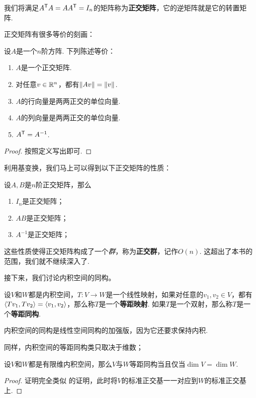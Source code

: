 我们将满足$A^{\mathsf{T}} A=AA^{\mathsf{T}}=I_n$的矩阵称为\textbf{正交矩阵}，它的逆矩阵就是它的转置矩阵. 

正交矩阵有很多等价的刻画：

\begin{proposition}\label{prop:orthogonal-matrix}
设$A$是一个$n$阶方阵. 下列陈述等价：
\begin{enumerate}
    \item $A$是一个正交矩阵.
    \item 对任意$v\in\mathbb{R}^n$，都有$\left\|Av\right\|=\left\|v\right\|$. 
    \item $A$的行向量是两两正交的单位向量.
    \item $A$的列向量是两两正交的单位向量.
    \item $A^{\mathsf{T}}=A^{-1}$.
\end{enumerate}
\end{proposition}
\begin{proof}
    按照定义写出即可. 
\end{proof}

利用基变换，我们马上可以得到以下正交矩阵的性质：

\begin{proposition}\label{prop:orthogonal-matrix-property}
设$A,B$是$n$阶正交矩阵，那么
\begin{enumerate}
    \item $I_n$是正交矩阵；
    \item $AB$是正交矩阵；
    \item $A^{-1}$是正交矩阵；
\end{enumerate}
\end{proposition}

这些性质使得正交矩阵构成了一个\emph{群}，称为\textbf{正交群}，记作$O(n)$. 这超出了本书的范围，我们就不继续深入了.


接下来，我们讨论内积空间的同构。

\begin{definition}[等距映射与等距同构]\label{def:isometry}
设$V$和$W$都是内积空间，$T:V\to W$是一个线性映射，如果对任意的$v_1,v_2\in V$，都有$\left\langle{Tv_1},{Tv_2}\right\rangle=\left\langle{v_1},{v_2}\right\rangle$，那么称$T$是一个\textbf{等距映射}. 如果$T$是一个双射，那么称$T$是一个\textbf{等距同构}.
\end{definition}

内积空间的同构是线性空间同构的加强版，因为它还要求保持内积.

同样，内积空间的等距同构类只取决于维数；

\begin{theorem}\label{thm:isometry}
设$V$和$W$都是有限维内积空间，那么$V$与$W$等距同构当且仅当$\dim V=\dim W$. 
\end{theorem}
\begin{proof}
    证明完全类似 的证明，此时将$V$的标准正交基一一对应到$W$的标准正交基上.
\end{proof}

